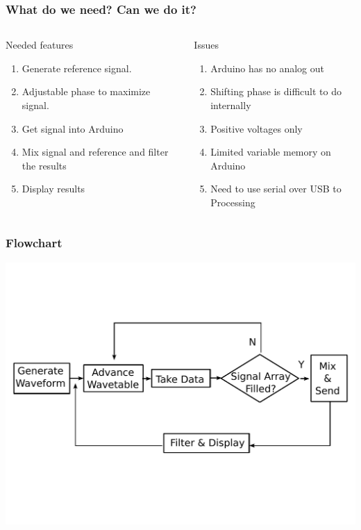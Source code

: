 \documentclass{beamer}
\begin{document}
\begin{frame}
\frametitle{What do we need? Can we do it?}
\begin{columns}
\begin{block}{Needed features}
\begin{enumerate}

\item {Generate reference signal.}
\item {Adjustable phase to maximize signal.}
\item {Get signal into Arduino}
\item {Mix signal and reference and filter the results}
\item {Display results}
\end{enumerate}
\end{block}
\pause
{}
\begin{block}{Issues}
\begin{enumerate}%
\item{Arduino has no analog out}
\item{Shifting phase is difficult to do internally}
\item{Positive voltages only}
\item{Limited variable memory on Arduino}
\item{Need to use serial over USB to Processing}
\end{enumerate}
\end{block}
\end{columns}
\end{frame}


\begin{frame}
\frametitle{Flowchart}
\includegraphics[scale=.5]{PSD_flowchart1}
\end{frame}
\end{document}
